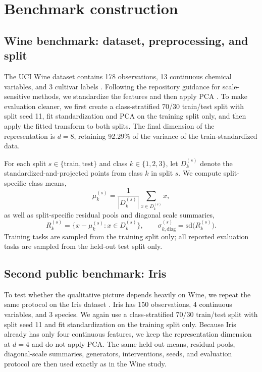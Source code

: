 \documentclass{article}
\begin{document}
\section{Benchmark construction}
\subsection{Wine benchmark: dataset, preprocessing, and split}
The UCI Wine dataset contains 178 observations, 13 continuous chemical variables, and 3 cultivar labels \citep{aeberhard1992wine}. Following the repository guidance for scale-sensitive methods, we standardize the features and then apply PCA \citep{jolliffe2002pca}. To make evaluation cleaner, we first create a class-stratified 70/30 train/test split with split seed 11, fit standardization and PCA on the training split only, and then apply the fitted transform to both splits. The final dimension of the representation is $d=8$, retaining 92.29\% of the variance of the train-standardized data.

For each split $s \in \{\mathrm{train},\mathrm{test}\}$ and class $k \in \{1,2,3\}$, let $D_k^{(s)}$ denote the standardized-and-projected points from class $k$ in split $s$. We compute split-specific class means,
\begin{equation}
\mu_k^{(s)} = \frac{1}{|D_k^{(s)}|} \sum_{x \in D_k^{(s)}} x,
\end{equation}
as well as split-specific residual pools and diagonal scale summaries,
\begin{equation}
R_k^{(s)} = \{x - \mu_k^{(s)} : x \in D_k^{(s)}\},
\qquad
\sigma_{k,\mathrm{diag}}^{(s)} = \mathrm{sd}\bigl(R_k^{(s)}\bigr).
\end{equation}
Training tasks are sampled from the training split only; all reported evaluation tasks are sampled from the held-out test split only.

\subsection{Second public benchmark: Iris}
To test whether the qualitative picture depends heavily on Wine, we repeat the same protocol on the Iris dataset \citep{fisher1936iris}. Iris has 150 observations, 4 continuous variables, and 3 species. We again use a class-stratified 70/30 train/test split with split seed 11 and fit standardization on the training split only. Because Iris already has only four continuous features, we keep the representation dimension at $d=4$ and do not apply PCA. The same held-out means, residual pools, diagonal-scale summaries, generators, interventions, seeds, and evaluation protocol are then used exactly as in the Wine study.
\end{document}
